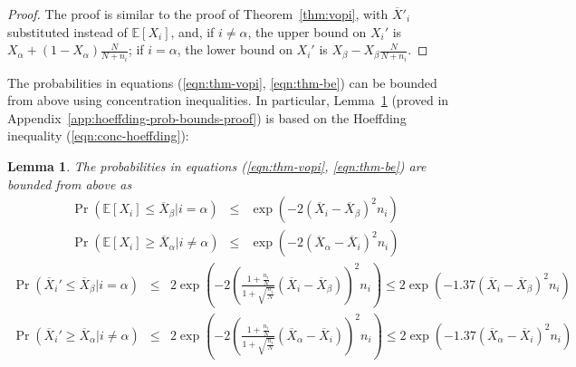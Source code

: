 \documentclass{article}
\newcommand {\IE} {\ensuremath {\mathbb{E}}}
\newtheorem{lmm}{Lemma}
\begin{document}
\begin{proof}
The proof is similar to the proof of Theorem~\ref{thm:vopi}, with
$\overline X'_i$ substituted instead of $\IE[X_i]$, and, if
$i\ne\alpha$, the upper bound on $X_i'$ is $X_\alpha+(1-X_\alpha)
\frac N {N+n_i}$; if $i=\alpha$, the lower bound on $X_i'$ is
$X_\beta - X_\beta \frac N {N+n_i}$.
\end{proof}

The probabilities in equations (\ref{eqn:thm-vopi}, \ref{eqn:thm-be})
can be bounded from above using concentration inequalities. In
particular, Lemma~\ref{lemma:hoeffding-prob-bounds} (proved in 
Appendix~\ref{app:hoeffding-prob-bounds-proof}) is based on the
Hoeffding inequality (\ref{eqn:conc-hoeffding}):
\begin{lmm} The probabilities in equations (\ref{eqn:thm-vopi},
\ref{eqn:thm-be}) are bounded from above as
\begin{eqnarray}
\Pr(\IE[X_i] \le \overline X_\beta|i=\alpha)&
   \le & \exp(-2 (\overline X_i - \overline X_\beta)^2 n_i)\nonumber\\
\Pr(\IE[X_i] \ge \overline X_\alpha|i\ne\alpha)&
   \le & \exp(-2 (\overline X_\alpha - \overline X_i)^2 n_i)
\label{eqn:probound-perf-hoeffding}
\end{eqnarray}
\vspace{-1.5\baselineskip}
\begin{eqnarray}
\Pr(\overline X_i' \le \overline X_\beta|i=\alpha) &
   \le & 2\exp\left(- 2\left(\frac {1+\frac {n_i} N} {1+\sqrt {\frac {n_i} N}}(\overline X_i - \overline X_\beta)\right)^2 n_i \right)
   \le 2\exp\left(- 1.37(\overline X_i - \overline X_\beta)^2 n_i \right) \nonumber\\
\Pr(\overline X_i' \ge \overline X_\alpha|i\ne\alpha) &
   \le & 2\exp\left(- 2\left(\frac {1+\frac {n_i} N} {1+\sqrt {\frac {n_i} N}} (\overline X_\alpha - \overline X_i)\right)^2 n_i \right)
    \le 2\exp\left(- 1.37(\overline X_\alpha - \overline X_i)^2 n_i \right)
\label{eqn:probound-blnk-hoeffding}
\end{eqnarray}
\label{lemma:hoeffding-prob-bounds}
\end{lmm}
\end{document}
